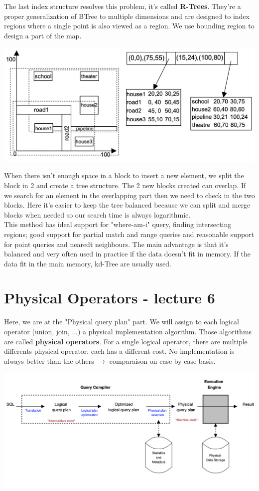 \documentclass[12pt,a4paper]{article}
\begin{document}
The last index structure resolves this problem, it's called \textbf{R-Trees}. They're a proper generalization of BTree to multiple dimensions and are designed to index regions where a single point is also viewed as a region. We use bounding region to design a part of the map.
\begin{center}
\includegraphics[scale=0.5]{img/img56.png}
\end{center} 
When there isn't enough space in a block to insert a new element, we split the block in 2 and create a tree structure. The 2 new blocks created can overlap. If we search for an element in the overlapping part then we need to check in the two blocks. Here it's easier to keep the tree balanced because we can split and merge blocks when needed so our search time is always logarithmic.\\
This method has ideal support for "where-am-i" query, finding intersecting regions; good support for partial match and range queries and reasonable support for point queries and nearedt neighbours.
The main advantage is that it's balanced and very often used in practice if the data doesn't fit in memory. If the data fit in the main memory, kd-Tree are usually used.

\section{Physical Operators - lecture 6}

Here, we are at the "Physical query plan" part. We will assign to each logical operator (union, join, ...) a physical implementation algorithm. Those algorithms are called \textbf{physical operators}. For a single logical operator, there are multiple differents physical operator, each has a different cost. No implementation is always better than the others $\rightarrow$ comparaison on case-by-case basis.

\begin{center}
	\includegraphics[scale=0.35]{img/img1.png}
\end{center}
\end{document}
